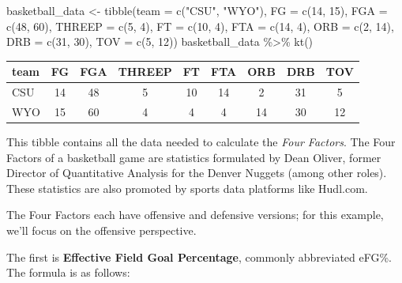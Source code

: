 \documentclass[
  11pt,
]{book}
\newenvironment{Shaded}{\begin{snugshade}}{\end{snugshade}}
\newcommand{\AttributeTok}[1]{\textcolor[rgb]{0.77,0.63,0.00}{#1}}
\newcommand{\DecValTok}[1]{\textcolor[rgb]{0.00,0.00,0.81}{#1}}
\newcommand{\FunctionTok}[1]{\textcolor[rgb]{0.00,0.00,0.00}{#1}}
\newcommand{\NormalTok}[1]{#1}
\newcommand{\OtherTok}[1]{\textcolor[rgb]{0.56,0.35,0.01}{#1}}
\newcommand{\SpecialCharTok}[1]{\textcolor[rgb]{0.00,0.00,0.00}{#1}}
\newcommand{\StringTok}[1]{\textcolor[rgb]{0.31,0.60,0.02}{#1}}
\theoremstyle{definition}
\theoremstyle{definition}
\theoremstyle{definition}
\theoremstyle{definition}
\theoremstyle{remark}
\begin{document}
\begin{Shaded}
\begin{Highlighting}[]
\NormalTok{basketball\_data }\OtherTok{\textless{}{-}} \FunctionTok{tibble}\NormalTok{(}\AttributeTok{team =} \FunctionTok{c}\NormalTok{(}\StringTok{"CSU"}\NormalTok{, }\StringTok{"WYO"}\NormalTok{), }\AttributeTok{FG =} \FunctionTok{c}\NormalTok{(}\DecValTok{14}\NormalTok{, }\DecValTok{15}\NormalTok{), }\AttributeTok{FGA =} \FunctionTok{c}\NormalTok{(}\DecValTok{48}\NormalTok{, }\DecValTok{60}\NormalTok{),}
    \AttributeTok{THREEP =} \FunctionTok{c}\NormalTok{(}\DecValTok{5}\NormalTok{, }\DecValTok{4}\NormalTok{), }\AttributeTok{FT =} \FunctionTok{c}\NormalTok{(}\DecValTok{10}\NormalTok{, }\DecValTok{4}\NormalTok{), }\AttributeTok{FTA =} \FunctionTok{c}\NormalTok{(}\DecValTok{14}\NormalTok{, }\DecValTok{4}\NormalTok{), }\AttributeTok{ORB =} \FunctionTok{c}\NormalTok{(}\DecValTok{2}\NormalTok{, }\DecValTok{14}\NormalTok{), }\AttributeTok{DRB =} \FunctionTok{c}\NormalTok{(}\DecValTok{31}\NormalTok{,}
        \DecValTok{30}\NormalTok{), }\AttributeTok{TOV =} \FunctionTok{c}\NormalTok{(}\DecValTok{5}\NormalTok{, }\DecValTok{12}\NormalTok{))}
\NormalTok{basketball\_data }\SpecialCharTok{\%\textgreater{}\%}
    \FunctionTok{kt}\NormalTok{()}
\end{Highlighting}
\end{Shaded}

\begin{table}[H]
\centering
\begin{tabular}{l|c|c|c|c|c|c|c|c}
\hline
team & FG & FGA & THREEP & FT & FTA & ORB & DRB & TOV\\
\hline
CSU & 14 & 48 & 5 & 10 & 14 & 2 & 31 & 5\\
\hline
WYO & 15 & 60 & 4 & 4 & 4 & 14 & 30 & 12\\
\hline
\end{tabular}
\end{table}

This tibble contains all the data needed to calculate the \emph{Four Factors}. The Four Factors of a basketball game are statistics formulated by Dean Oliver, former Director of Quantitative Analysis for the Denver Nuggets (among other roles). These statistics are also promoted by sports data platforms like Hudl.com.

The Four Factors each have offensive and defensive versions; for this example, we'll focus on the offensive perspective.

The first is \textbf{Effective Field Goal Percentage}, commonly abbreviated eFG\%. The formula is as follows:
\end{document}
